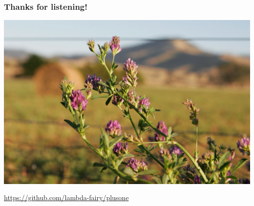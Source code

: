 \documentclass{beamer}
\begin{document}
\begin{frame}
    \frametitle{Thanks for listening!}
    \begin{center}
        \includegraphics[height=0.5\paperwidth]{Lucerne_flowers.jpg}

        \url{https://github.com/lambda-fairy/plusone}
    \end{center}
\end{frame}
\end{document}
